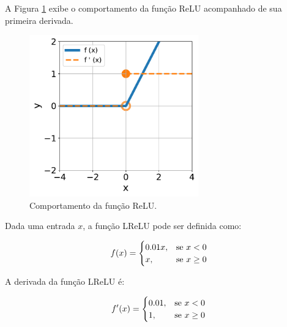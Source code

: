 A Figura \ref{fig:ann_relu_function} exibe o comportamento da função ReLU \citep{nair2010rectified} acompanhado de sua primeira derivada.

\begin{figure}[H]
    \centering
    \includegraphics[width=0.65\textwidth]{figs/ann_relu_function.pdf}

    \caption{Comportamento da função ReLU.}
    \label{fig:ann_relu_function}
\end{figure}


\linebreak
\newpage


\begin{definition}
    Dada uma entrada $x$, a função LReLU pode ser definida como:

    \begin{equation}
        f(x) = 
        \begin{cases}
            0.01 x, & \text{se $x < 0$}\\
            x, & \text{se $x \geq 0$}
        \end{cases}
        \vspace{0.2cm}
        \label{eq:ann_lrelu_function}
    \end{equation}

    A derivada da função LReLU é:

    \begin{equation}
        f'(x) = 
        \begin{cases}
            0.01, & \text{se $x < 0$}\\
            1, & \text{se $x \geq 0$}
        \end{cases}
        \vspace{0.2cm}
        \label{eq:ann_lrelu_function_dy}
    \end{equation}

\end{definition}

